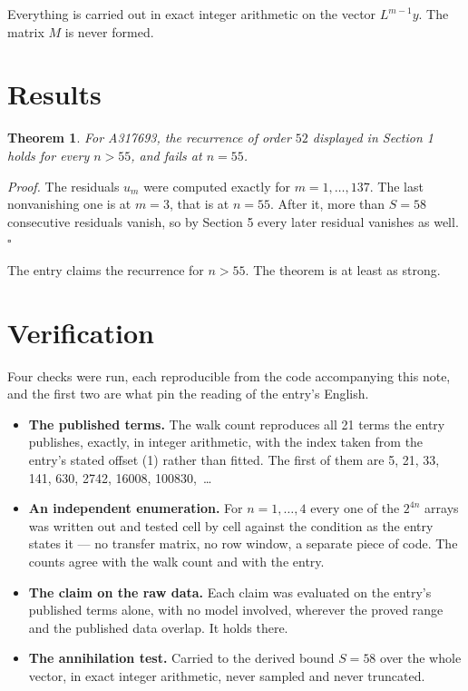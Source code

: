 \documentclass[11pt]{article}
\newtheorem{theorem}{Theorem}
\theoremstyle{definition}
\begin{document}
Everything is carried out in exact integer arithmetic on the vector $L^{m-1}y$. The matrix $M$ is never formed.

\section{Results}

\begin{theorem} For A317693, the recurrence of order $52$ displayed in Section 1 holds for every $n > 55$, and fails at $n = 55$.\end{theorem}

{\itshape Proof.} The residuals $u_m$ were computed exactly for $m = 1,\dots,137$. The last nonvanishing one is at $m = 3$, that is at $n = 55$. After it, more than $S = 58$ consecutive residuals vanish, so by Section 5 every later residual vanishes as well. $\square$

The entry claims the recurrence for $n > 55$. The theorem is at least as strong.

\section{Verification}

Four checks were run, each reproducible from the code accompanying this note, and the first two are what pin the reading of the entry's English.

\begin{itemize}

\item {\bfseries The published terms.} The walk count reproduces all 21 terms the entry publishes, exactly, in integer arithmetic, with the index taken from the entry's stated offset (1) rather than fitted. The first of them are 5, 21, 33, 141, 630, 2742, 16008, 100830,~\dots

\item {\bfseries An independent enumeration.} For $n = 1,\dots,4$ every one of the $2^{4n}$ arrays was written out and tested cell by cell against the condition as the entry states it --- no transfer matrix, no row window, a separate piece of code. The counts agree with the walk count and with the entry.

\item {\bfseries The claim on the raw data.} Each claim was evaluated on the entry's published terms alone, with no model involved, wherever the proved range and the published data overlap. It holds there.

\item {\bfseries The annihilation test.} Carried to the derived bound $S = 58$ over the whole vector, in exact integer arithmetic, never sampled and never truncated.

\end{itemize}
\end{document}
